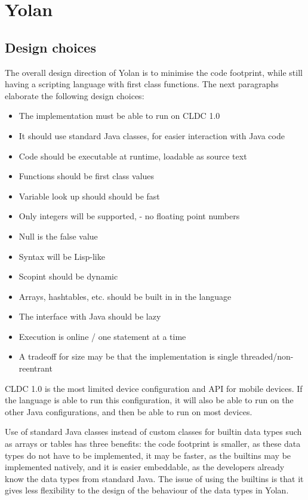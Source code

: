 \documentclass[11pt]{report}
\begin{document}
\chapter{Yolan}
\label{yolan}
\section{Design choices}
The overall design direction of Yolan is to minimise the code footprint, while still having a scripting language with first class functions.
The next paragraphs elaborate the following design choices:
\begin{itemize}
\item The implementation must be able to run on CLDC 1.0
\item It should use standard Java classes, for easier interaction with Java code
\item Code should be executable at runtime, loadable as source text
\item Functions should be first class values
\item Variable look up should should be fast
\item Only integers will be supported, - no floating point numbers
\item Null is the false value
\item Syntax will be Lisp-like
\item Scopint should be dynamic
\item Arrays, hashtables, etc. should be built in in the language
\item The interface with Java should be lazy
\item Execution is online / one statement at a time
\item A tradeoff for size may be that the implementation is single threaded/non-reentrant 
\end{itemize}

CLDC 1.0 is the most limited device configuration and API for mobile devices. If the language is able to run this configuration, it will also be able to run on the other Java configurations, and then be able to run on most devices.

\label{yolandesign}
Use of standard Java classes instead of custom classes for builtin data types such as arrays or tables has three benefits: the code footprint is smaller, as these data types do not have to be implemented, it may be faster, as the builtins may be implemented natively, and it is easier embeddable, as the developers already know the data types from standard Java.
The issue of using the builtins is that it gives less flexibility to the design of the behaviour of the data types in Yolan.
\end{document}
